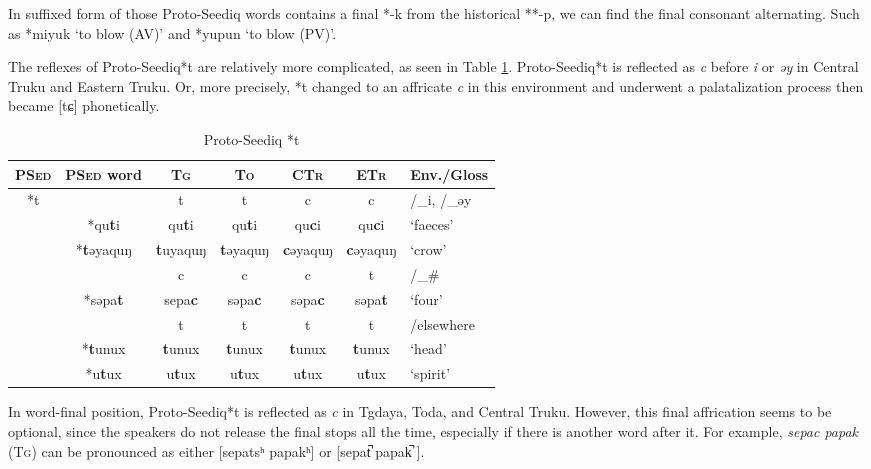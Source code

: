 \documentclass[12pt]{article}
\newcommand{\psed}{\textsc{PSed}\xspace}
\newcommand{\psedf}{Proto-Seediq\xspace}
\newcommand{\stg}{\textsc{Tg}\xspace}
\newcommand{\stgf}{Tgdaya\xspace}
\newcommand{\sto}{\textsc{To}\xspace}
\newcommand{\stof}{Toda\xspace}
\newcommand{\sctr}{\textsc{CTr}\xspace}
\newcommand{\sctrf}{Central Truku\xspace}
\newcommand{\setr}{\textsc{ETr}\xspace}
\newcommand{\setrf}{Eastern Truku\xspace}
\begin{document}
In suffixed form of those \psedf words contains a final *-k from the historical **-p, we can find the final consonant alternating. Such as *miyuk `to blow (AV)' and *yupun `to blow (PV)'. 

The reflexes of \psedf *t are relatively more complicated, as seen in Table \ref{tab:t}. \psedf *t is reflected as \textit{c} before \textit{i} or \textit{əy} in \sctrf and \setrf. Or, more precisely, *t changed to an affricate \textit{c} in this environment and underwent a palatalization process then became [tɕ] phonetically. 

\begin{table}[!htbp]
\centering
\caption{Proto-Seediq *t}
\label{tab:t}
\begin{tabular}{c|c|cccc|l}
\textbf{\psed} & \textbf{\psed word}      & \textbf{\stg} & \textbf{\sto} & \textbf{\sctr} & \textbf{\setr} & \multicolumn{1}{c}{\textbf{Env./Gloss}} \\ \hline
\multirow{8}{*}{*t} &  & t    & t    & c     & c     & /\_i, /\_əy                \\  \cline{2-7}
                    & *qu\textbf{t}i & qu\textbf{t}i & qu\textbf{t}i & qu\textbf{c}i & qu\textbf{c}i & `faeces'                          \\
                    & *\textbf{t}əyaquŋ & \textbf{t}uyaquŋ & \textbf{t}əyaquŋ & \textbf{c}əyaquŋ & \textbf{c}əyaquŋ & `crow'          \\ \cline{2-7}
                   &  & c    & c    & c     & t     & /\_\#                         \\ \cline{2-7}
                   & *səpa\textbf{t} & sepa\textbf{c} & səpa\textbf{c} & səpa\textbf{c} & səpa\textbf{t} & `four'                  \\ \cline{2-7}
                   & & t    & t    & t     & t     & /elsewhere               \\ \cline{2-7}
                   & *\textbf{t}unux & \textbf{t}unux & \textbf{t}unux & \textbf{t}unux & \textbf{t}unux  & `head'                   \\ 
                   & *u\textbf{t}ux & u\textbf{t}ux & u\textbf{t}ux & u\textbf{t}ux & u\textbf{t}ux  & `spirit'                        \\ \hline
\end{tabular}
\end{table}

In word-final position, \psedf *t is reflected as \textit{c} in \stgf, \stof, and \sctrf. However, this final affrication seems to be optional, since the speakers do not release the final stops all the time, especially if there is another word after it. For example, \textit{sepac papak} (\stg) can be pronounced as either [sepatsʰ papakʰ] or [sepat̚  papak̚ ]. 
\end{document}
